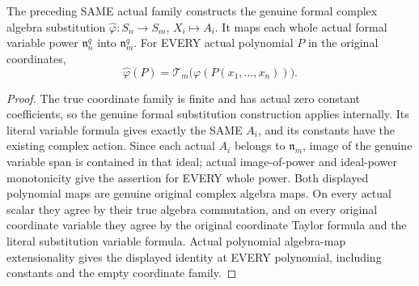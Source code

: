 \begin{theorem}
\label{hir:actual-formal-original-pullback-substitution-polynomials}
The preceding SAME actual family constructs the genuine formal complex
algebra substitution $\widehat\varphi:S_n\to S_m$, $X_i\mapsto A_i$.
It maps each whole actual formal variable power $\mathfrak n_n^q$
into $\mathfrak n_m^q$. For EVERY actual polynomial $P$ in the
original coordinates,
\[
 \widehat\varphi(P)=\mathcal T_m\bigl(\varphi(P(x_1,\ldots,x_n))\bigr).
\]
\leanok
\end{theorem}
\begin{proof}
The true coordinate family is finite and has actual zero constant
coefficients, so the genuine formal substitution construction applies
internally. Its literal variable formula gives exactly the SAME $A_i$,
and its constants have the existing complex action. Since each actual
$A_i$ belongs to $\mathfrak n_m$, image of the genuine variable span
is contained in that ideal; actual image-of-power and ideal-power
monotonicity give the assertion for EVERY whole power.
Both displayed polynomial maps are genuine original complex algebra
maps. On every actual scalar they agree by their true algebra
commutation, and on every original coordinate variable they agree by
the original coordinate Taylor formula and the literal substitution
variable formula. Actual polynomial algebra-map extensionality gives
the displayed identity at EVERY polynomial, including constants and
the empty coordinate family.
\end{proof}

